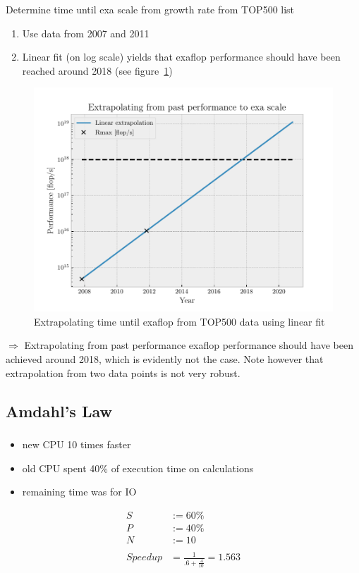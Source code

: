 \documentclass[]{scrartcl}
\begin{document}
\subsubsection{}
Determine time until exa scale from growth rate from TOP500 list
\begin{enumerate}
	\item Use data from 2007 and 2011
	\item Linear fit (on log scale) yields that exaflop performance should
		have been reached around 2018 (see figure~\ref{fig:GrowthRate})
\end{enumerate}
\begin{figure}[htpb]
	\centering
	\includegraphics[width=0.8\linewidth]{./plots/GrowthRate.pdf}
	\caption{Extrapolating time until exaflop from TOP500 data using linear fit}%
	\label{fig:GrowthRate}
\end{figure}
$ \Rightarrow $ Extrapolating from past performance exaflop performance should have been
achieved around 2018, which is evidently not the case. Note however that extrapolation
from two data points is not very robust.

\newpage
\subsection{Amdahl's Law}
\subsubsection{}
\begin{itemize}
    \item new CPU 10 times faster
    \item old CPU spent 40\% of execution time on calculations
    \item remaining time was for IO
\end{itemize}
\begin{align}
    S &:= 60\%\\
    P &:= 40\%\\
    N &:= 10\\\nonumber\\
    Speedup &= \frac{1}{.6+\frac{.4}{10}} = 1.563
\end{align}
\end{document}
